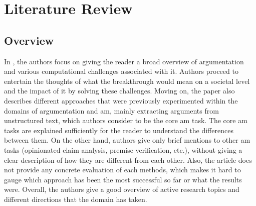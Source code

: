 \section{Literature Review}
    \subsection{Overview}
        In \autocite{Lippi2016ArgumentationMS}, the authors focus on giving the reader a broad overview of argumentation and various computational challenges associated with it. Authors proceed to entertain the thoughts of what the breakthrough would mean on a societal level and the impact of it by solving these challenges. Moving on, the paper also describes different approaches that were previously experimented within the domains of argumentation and \gls{am}, mainly extracting arguments from unstructured text, which authors consider to be the core \gls{am} task. The core \gls{am} tasks are explained sufficiently for the reader to understand the differences between them. On the other hand, authors give only brief mentions to other \gls{am} tasks (opinionated claim analysis, premise verification, etc.), without giving a clear description of how they are different from each other. Also, the article does not provide any concrete evaluation of each methods, which makes it hard to gauge which approach has been the most successful so far or what the results were. Overall, the authors give a good overview of active research topics and different directions that the domain has taken.
        
